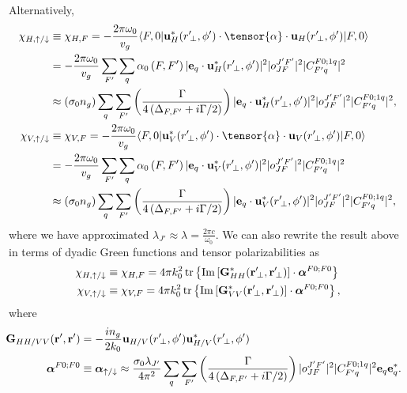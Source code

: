 \documentclass[preprint,aps,pra,onecolumn]{revtex4-1} %
\begin{document}
Alternatively,
\begin{align}
\chi_{H,\uparrow/\downarrow} & \equiv \chi_{H,F} =- \frac{2\pi \omega_0}{v_g} \bra{F,0} 
	\mathbf{u}^*_H(r^\prime\!_\perp, \phi') \cdot \tensor{\alpha} \cdot 
	\mathbf{u}_{H}(r^\prime\!_\perp, 
	\phi') \ket{F,0} \\
	& =- \frac{2\pi \omega_0}{v_g} \sum_{F'} \sum_q \alpha_0\left( F,F'  \right) |\mathbf{e}_q \cdot 
	\mathbf{u}_H^*(r^\prime\!_\perp,\phi')|^2 |o^{J'F'}_{JF} |^2 
	|C^{F 0;1q}_{F' q}|^2\\
	& \approx  \left( \sigma_0 n_g  \right)  \sum_q \sum_{F'} \left( 
		\frac{\Gamma}{4 
		\left(\Delta_{F,F'}+i\Gamma/2\right) }  \right) |\mathbf{e}_q \cdot 
		\mathbf{u}_H^*(r^\prime\!_\perp,\phi')|^2 |o^{J'F'}_{JF} |^2 
		|C^{F 0;1q}_{F' q}|^2,\label{eq:chiHeu}\\
\chi_{V,\uparrow/\downarrow} & \equiv \chi_{V,F} =- \frac{2\pi \omega_0}{v_g} \bra{F,0} 
	\mathbf{u}^*_V(r^\prime\!_\perp, \phi') \cdot \tensor{\alpha} \cdot 
	\mathbf{u}_{V}(r^\prime\!_\perp, 
	\phi') \ket{F,0} \\
	& =- \frac{2\pi \omega_0}{v_g} \sum_{F'} \sum_q \alpha_0\left( F,F'  \right) |\mathbf{e}_q \cdot 
	\mathbf{u}_V^*(r^\prime\!_\perp,\phi')|^2 |o^{J'F'}_{JF} |^2 
	|C^{F 0;1q}_{F' q}|^2\\
	& \approx   \left( \sigma_0 n_g  \right)  \sum_q\sum_{F'} \left( 
		\frac{\Gamma}{4 
		\left(\Delta_{F,F'}+i\Gamma/2\right) }  \right) |\mathbf{e}_q \cdot 
		\mathbf{u}_V^*(r^\prime\!_\perp,\phi')|^2 |o^{J'F'}_{JF} |^2 
		|C^{F 0;1q}_{F' q}|^2,\label{eq:chiVeu}
\end{align}
where we have approximated $ \lambda_{J'}\approx \lambda = \frac{2\pi c}{\omega_0} $.  We can also 
rewrite the result above in terms of dyadic Green functions and tensor polarizabilities as
\begin{align}
\chi_{H,\uparrow/\downarrow} & \equiv \chi_{H,F} = 4\pi k_0^2 \operatorname{tr} \left\{ \mathrm{Im}\left[ 
\mathbf{G}^*_{HH}(\mathbf{r}^\prime\!_\perp,\mathbf{r}^\prime\!_\perp) \right] \cdot \boldsymbol{\alpha}^{F0;F0} 
\right\}\label{eq:chiHGalpha}\\
\chi_{V,\uparrow/\downarrow} & \equiv \chi_{V,F} = 4\pi k_0^2 \operatorname{tr} \left\{ \mathrm{Im}\left[ 
\mathbf{G}^*_{VV}(\mathbf{r}^\prime\!_\perp,\mathbf{r}^\prime\!_\perp) \right] \cdot \boldsymbol{\alpha}^{F0;F0} 
\right\},\label{eq:chiGalpha}
\end{align}
where 
\begin{align} 
\!\!\!\! \mathbf{G}_{HH/VV}(\mathbf{r}',\mathbf{r}') &= -\frac{in_g}{2k_0} 
\mathbf{u}_{H/V}(r^\prime\!_\perp,\phi')\mathbf{u}_{H/V}^*(r^\prime\!_\perp,\phi')\\
\boldsymbol{\alpha}^{F0;F0} &\equiv \boldsymbol{\alpha}_{\uparrow/\downarrow} \approx \frac{\sigma_0\lambda_{J'}}{4\pi^2}  \sum_q \sum_{F'} \left( 
		\frac{\Gamma}{4 
		\left(\Delta_{F,F'}+i\Gamma/2\right) }  \right)   |o^{J'F'}_{JF} |^2 
		|C^{F 0;1q}_{F' q}|^2  \mathbf{e}_q \mathbf{e}_q^*.
\end{align}
\end{document}
